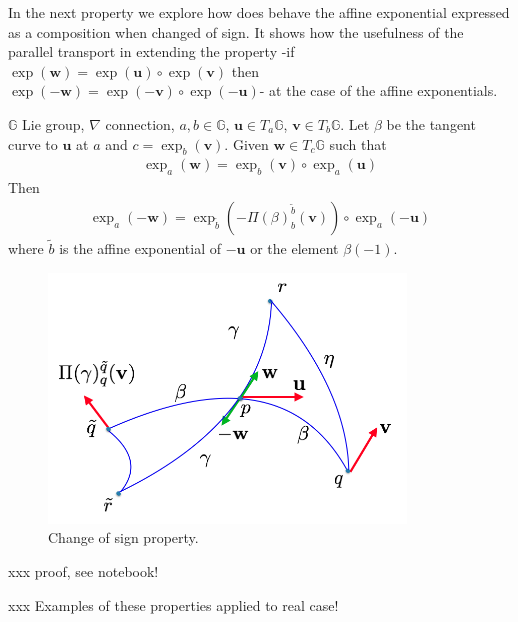In the next property we explore how does behave the affine exponential expressed as a composition when changed of sign. It shows how the usefulness of the parallel transport in extending the property -if $\exp(\mathbf{w}) = \exp(\mathbf{u}) \circ \exp(\mathbf{v})$ then $\exp(\mathbf{-w}) = \exp(\mathbf{-v}) \circ \exp(\mathbf{-u})$- at the case of the affine exponentials.
\begin{prop}
	$\mathbb{G}$ Lie group, $\nabla$ connection, $a,b\in\mathbb{G}$, $\mathbf{u}\in T_{a}\mathbb{G}$, $\mathbf{v}\in T_{b}\mathbb{G}$. Let $\beta$ be the tangent curve to $\mathbf{u}$ at $a$ and $c= \exp_{b}(\mathbf{v})$. Given $\mathbf{w} \in T_{c}\mathbb{G}$ such that 
	\begin{align*}
	\exp_{a}(\mathbf{w}) = \exp_{b}(\mathbf{v}) \circ \exp_{a}(\mathbf{u})
	\end{align*}
	Then
	\begin{align*}
	\exp_{a}(-\mathbf{w}) = \exp_{\tilde{b}}(-\Pi(\beta)_{b}^{\tilde{b}}(\mathbf{v})) \circ \exp_{a}(-\mathbf{u})
	\end{align*}
	where $\tilde{b}$ is the affine exponential of $-\mathbf{u}$ or the element $\beta(-1)$.
\end{prop}


\begin{figure}[htbp]
	\centering
	\includegraphics[width=9.5cm]{figures/sign_1.png}
	\caption{Change of sign property.}
	\label{fig:sign_propr}
\end{figure}


\noindent
xxx proof, see notebook!

\noindent
xxx Examples of these properties applied to real case!

